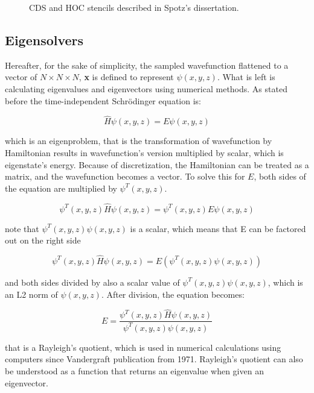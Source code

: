 \begin{figure}[t]
	\caption{CDS and HOC stencils described in Spotz's dissertation.\cite{spotz1996hoc}}
	\label{fig:stencils}
\end{figure}

\subsection{Eigensolvers}
Hereafter, for the sake of simplicity, the sampled wavefunction flattened to a vector of $N \times N \times N$, \textbf{x} is defined to represent $\psi(x,y,z)$. What is left is calculating eigenvalues and eigenvectors using numerical methods. As stated before the time-independent Schr{\"o}dinger equation is:

\begin{equation}
	\hat{H} \psi(x,y,z) = E \psi(x,y,z)
\end{equation}

\noindent which is an eigenproblem, that is the transformation of wavefunction by Hamiltonian results in wavefunction's version multiplied by scalar, which is eigenstate's energy. Because of discretization, the Hamiltonian can be treated as a matrix, and the wavefunction becomes a vector. To solve this for $E$, both sides of the equation are multiplied by $\psi^T(x,y,z).$

\begin{equation}
	\psi^T(x,y,z) \hat{H} \psi(x,y,z) = \psi^T(x,y,z) E \psi(x,y,z)
\end{equation}

\noindent note that $\psi^T(x,y,z)\psi(x,y,z)$ is a scalar, which means that E can be factored out on the right side

\begin{equation}
	\psi^T(x,y,z) \hat{H} \psi(x,y,z) = E(\psi^T(x,y,z) \psi(x,y,z))
\end{equation}

\noindent and both sides divided by also a scalar value of $\psi^T(x,y,z) \psi(x,y,z)$, which is an L2 norm of $\psi(x,y,z)$. After division, the equation becomes:

\begin{equation}
	E = \frac{\psi^T(x,y,z) \hat{H} \psi(x,y,z)}{\psi^T(x,y,z) \psi(x,y,z)}
\end{equation}

\noindent that is a Rayleigh's quotient, which is used in numerical calculations using computers since Vandergraft\cite{vandergraft1971} publication from 1971. Rayleigh's quotient can also be understood as a function that returns an eigenvalue when given an eigenvector.

